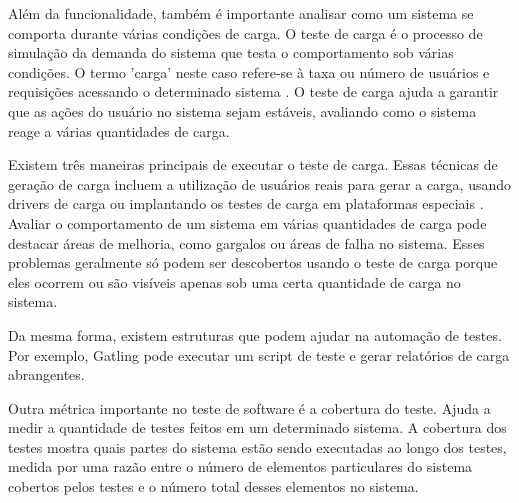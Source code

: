 Além da funcionalidade, também é importante analisar como um sistema se comporta durante várias condições de carga.
O teste de carga é o processo de simulação da demanda do sistema que testa o comportamento sob várias condições. O termo 'carga' neste caso refere-se à taxa ou número de usuários e requisições acessando o determinado sistema \cite{jiang2008automatic}. O teste de carga ajuda a garantir que as ações do usuário no sistema sejam estáveis, avaliando como o sistema reage a várias quantidades de carga.

Existem três maneiras principais de executar o teste de carga. Essas técnicas de geração de carga incluem a utilização de usuários reais para gerar a carga, usando drivers de carga ou implantando os testes de carga em plataformas especiais \cite{jiang2015survey}. Avaliar o comportamento de um sistema em várias quantidades de carga pode destacar áreas de melhoria, como gargalos ou áreas de falha no sistema. Esses problemas geralmente só podem ser descobertos usando o teste de carga porque eles ocorrem ou são visíveis apenas sob uma certa quantidade de carga no sistema.

Da mesma forma, existem estruturas que podem ajudar na automação de testes. Por exemplo, Gatling \cite{gatling} pode executar um script de teste e gerar relatórios de carga abrangentes.


Outra métrica importante no teste de software é a cobertura do teste. Ajuda a medir a quantidade de testes feitos em um determinado sistema. A cobertura dos testes mostra quais partes do sistema estão sendo executadas ao longo dos testes, medida por uma razão entre o número de elementos particulares do sistema cobertos pelos testes e o número total desses elementos no sistema. %




